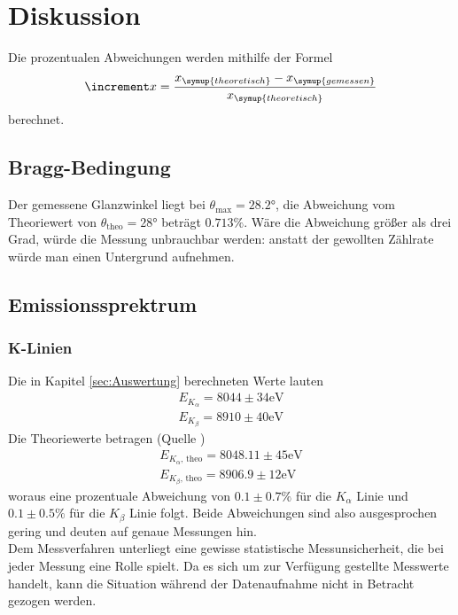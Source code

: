 \section{Diskussion}
\label{sec:Diskussion}
Die prozentualen Abweichungen werden mithilfe der Formel
\begin{equation*}
    \increment x = \frac{x_{\symup{theoretisch}} - x_{\symup{gemessen}}}{x_{\symup{theoretisch}}}
\end{equation*}
berechnet.

\subsection{Bragg-Bedingung}
    Der gemessene Glanzwinkel liegt bei $\theta_{\text{max}} = 28.2 °$, die Abweichung vom Theoriewert von $\theta_{\text{theo}} = 28 °$ beträgt $0.713 \%$.
    Wäre die Abweichung größer als drei Grad, würde die Messung unbrauchbar werden: anstatt der gewollten Zählrate würde man einen 
    Untergrund aufnehmen.

\subsection{Emissionssprektrum}
    \subsubsection{K-Linien}
        Die in Kapitel \ref{sec:Auswertung} berechneten Werte lauten
        \begin{align*}
            E_{K_{\alpha}} = 8044 \pm 34 \text{eV}\\
            E_{K_{\beta}} = 8910 \pm 40 \text{eV}
        \end{align*}
        Die Theoriewerte betragen (Quelle \cite{nist})
        \begin{align*}
            E_{K_{\alpha}\text{, theo}} = 8048.11 \pm 45 \text{eV}\\
            E_{K_{\beta}\text{, theo}} = 8906.9 \pm 12 \text{eV}
        \end{align*}
        woraus eine prozentuale Abweichung von $0.1 \pm 0.7 \%$ für die $K_{\alpha}$ Linie und $0.1 \pm 0.5 \%$ für die $K_{\beta}$ Linie folgt. Beide Abweichungen sind also 
        ausgesprochen gering und deuten auf genaue Messungen hin.\\
        Dem Messverfahren unterliegt eine gewisse statistische Messunsicherheit, die bei jeder Messung eine Rolle spielt. Da es sich um zur Verfügung gestellte Messwerte handelt,
        kann die Situation während der Datenaufnahme nicht in Betracht gezogen werden.

